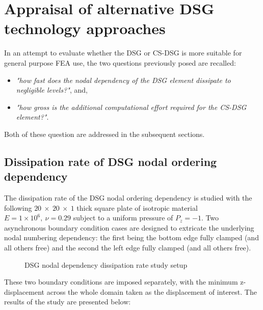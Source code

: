 \section{Appraisal of alternative DSG technology approaches}
\label{CSDSG appraisal}
In an attempt to evaluate whether the DSG or CS-DSG is more suitable for general purpose FEA use, the two questions previously posed are recalled:

\begin{itemize}
	\item \textit{"how fast does the nodal dependency of the DSG element dissipate to negligible levels?"}, and,
	\item \textit{"how gross is the additional computational effort required for the CS-DSG element?"}.
\end{itemize}

Both of these question are addressed in the subsequent sections.

\subsection{Dissipation rate of DSG nodal ordering dependency}
The dissipation rate of the DSG nodal ordering dependency is studied with the following $20\ \times\ 20\ \times\ 1$ thick square plate of isotropic material $E = 1\times10^6,\ \nu = 0.29$ subject to a uniform pressure of $P_z = -1$. Two asynchronous boundary condition cases are designed to extricate the underlying nodal numbering dependency: the first being the bottom edge fully clamped (and all others free) and the second the left edge fully clamped (and all others free). 

\begin{figure}[H]
	\caption{\label{csdsg_nodal_dissipation}DSG nodal dependency dissipation rate study setup}
\end{figure}

These two boundary conditions are imposed separately, with the minimum z-displacement across the whole domain taken as the displacement of interest. The results of the study are presented below:


